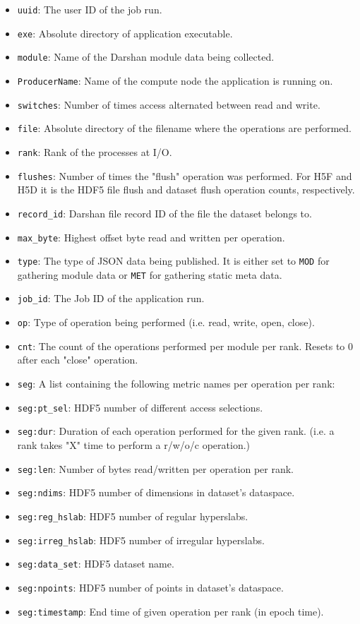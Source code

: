 \begin{itemize}
    \item \texttt{uuid}: The user ID of the job run.
    \item \texttt{exe}: Absolute directory of application executable.
    \item \texttt{module}: Name of the Darshan module data being collected.
    \item \texttt{ProducerName}: Name of the compute node the application is running on.
    \item \texttt{switches}: Number of times access alternated between read and write.
    \item \texttt{file}: Absolute directory of the filename where the operations are performed.
    \item \texttt{rank}: Rank of the processes at I/O.
    \item \texttt{flushes}: Number of times the "flush" operation was performed. For H5F and H5D it is the HDF5 file flush and dataset flush operation counts, respectively.
    \item \texttt{record\_id}: Darshan file record ID of the file the dataset belongs to.
    \item \texttt{max\_byte}: Highest offset byte read and written per operation.
    \item \texttt{type}: The type of JSON data being published. It is either set to \texttt{MOD} for gathering module data or \texttt{MET} for gathering static meta data.
    \item \texttt{job\_id}: The Job ID of the application run.
    \item \texttt{op}: Type of operation being performed (i.e. read, write, open, close).
    \item \texttt{cnt}: The count of the operations performed per module per rank. Resets to 0 after each "close" operation.
    \item \texttt{seg}: A list containing the following metric names per operation per rank:
    \item \texttt{seg:pt\_sel}: HDF5 number of different access selections.
    \item \texttt{seg:dur}: Duration of each operation performed for the given rank. (i.e. a rank takes "X" time to perform a r/w/o/c operation.)
    \item \texttt{seg:len}: Number of bytes read/written per operation per rank. 
    \item \texttt{seg:ndims}: HDF5 number of dimensions in dataset's dataspace.
    \item \texttt{seg:reg\_hslab}: HDF5 number of regular hyperslabs.
    \item \texttt{seg:irreg\_hslab}: HDF5 number of irregular hyperslabs.
    \item \texttt{seg:data\_set}: HDF5 dataset name. 
    \item \texttt{seg:npoints}: HDF5 number of points in dataset's dataspace.
    \item\texttt{seg:timestamp}: End time of given operation per rank (in epoch time).
\end{itemize}

